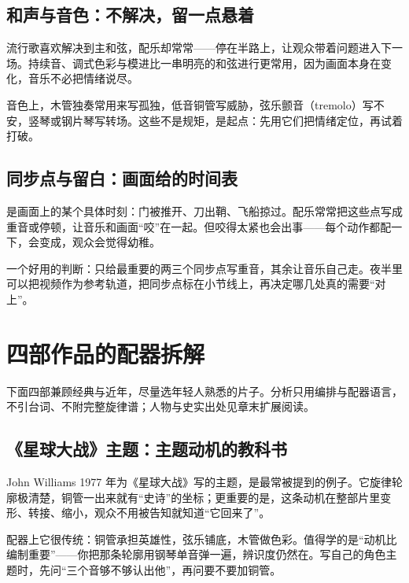 \subsection{和声与音色：不解决，留一点悬着}
\label{sec:film-harmony}

流行歌喜欢解决到主和弦，配乐却常常——停在半路上，让观众带着问题进入下一场。持续音、调式色彩与模进比一串明亮的和弦进行更常用，因为画面本身在变化，音乐不必把情绪说尽。

音色上，木管独奏常用来写孤独，低音铜管写威胁，弦乐颤音（tremolo）写不安，竖琴或钢片琴写转场。这些不是规矩，是起点：先用它们把情绪定位，再试着打破。

\subsection{同步点与留白：画面给的时间表}
\label{sec:film-sync}

是画面上的某个具体时刻：门被推开、刀出鞘、飞船掠过。配乐常常把这些点写成重音或停顿，让音乐和画面“咬”在一起。但咬得太紧也会出事——每个动作都配一下，会变成，观众会觉得幼稚。

一个好用的判断：只给最重要的两三个同步点写重音，其余让音乐自己走。夜半里可以把视频作为参考轨道，把同步点标在小节线上，再决定哪几处真的需要“对上”。

\section{四部作品的配器拆解}
\label{sec:film-cases}

下面四部兼顾经典与近年，尽量选年轻人熟悉的片子。分析只用编排与配器语言，不引台词、不附完整旋律谱；人物与史实出处见章末扩展阅读。

\subsection{《星球大战》主题：主题动机的教科书}
\label{sec:film-case-starwars}

John Williams 1977 年为《星球大战》写的主题，是最常被提到的例子。它旋律轮廓极清楚，铜管一出来就有“史诗”的坐标；更重要的是，这条动机在整部片里变形、转接、缩小，观众不用被告知就知道“它回来了”。

配器上它很传统：铜管承担英雄性，弦乐铺底，木管做色彩。值得学的是“动机比编制重要”——你把那条轮廓用钢琴单音弹一遍，辨识度仍然在。写自己的角色主题时，先问“三个音够不够认出他”，再问要不要加铜管。

